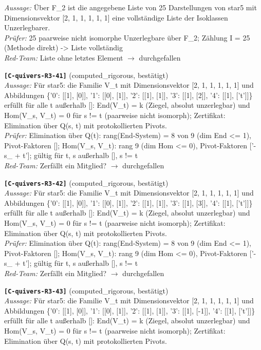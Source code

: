\documentclass[11pt]{article}
\theoremstyle{definition}\newtheorem{definition}[theorem]{Definition}\newtheorem{remark}[theorem]{Remark}\newtheorem{observation}[theorem]{Numerical observation}
\begin{document}
\textit{Aussage:} Über F\_2 ist die angegebene Liste von 25 Darstellungen von star5 mit Dimensionsvektor [2, 1, 1, 1, 1, 1] eine vollständige Liste der Isoklassen Unzerlegbarer.\\
\textit{Prüfer:} 25 paarweise nicht isomorphe Unzerlegbare über F\_2; Zählung I = 25 (Methode direkt) -> Liste vollständig\\
\textit{Red-Team:} Liste ohne letztes Element $\to$ durchgefallen\par\medskip
\noindent\textbf{\texttt{[C-quivers-R3-41]}} (computed\_rigorous, bestätigt)\\
\textit{Aussage:} Für star5: die Familie V\_t mit Dimensionsvektor [2, 1, 1, 1, 1, 1] und Abbildungen \{'0': [[1], [0]], '1': [[0], [1]], '2': [[1], [1]], '3': [[1], [2]], '4': [[1], ['t']]\} erfüllt für alle t außerhalb []: End(V\_t) = k (Ziegel, absolut unzerlegbar) und Hom(V\_s, V\_t) = 0 für s != t (paarweise nicht isomorph); Zertifikat: Elimination über Q(s, t) mit protokollierten Pivots.\\
\textit{Prüfer:} Elimination über Q(t): rang(End-System) = 8 von 9 (dim End <= 1), Pivot-Faktoren []; Hom(V\_s, V\_t): rang 9 (dim Hom <= 0), Pivot-Faktoren ['-s\_ + t']; gültig für t, s außerhalb [], s != t\\
\textit{Red-Team:} Zerfällt ein Mitglied? $\to$ durchgefallen\par\medskip
\noindent\textbf{\texttt{[C-quivers-R3-42]}} (computed\_rigorous, bestätigt)\\
\textit{Aussage:} Für star5: die Familie V\_t mit Dimensionsvektor [2, 1, 1, 1, 1, 1] und Abbildungen \{'0': [[1], [0]], '1': [[0], [1]], '2': [[1], [1]], '3': [[1], [3]], '4': [[1], ['t']]\} erfüllt für alle t außerhalb []: End(V\_t) = k (Ziegel, absolut unzerlegbar) und Hom(V\_s, V\_t) = 0 für s != t (paarweise nicht isomorph); Zertifikat: Elimination über Q(s, t) mit protokollierten Pivots.\\
\textit{Prüfer:} Elimination über Q(t): rang(End-System) = 8 von 9 (dim End <= 1), Pivot-Faktoren []; Hom(V\_s, V\_t): rang 9 (dim Hom <= 0), Pivot-Faktoren ['-s\_ + t']; gültig für t, s außerhalb [], s != t\\
\textit{Red-Team:} Zerfällt ein Mitglied? $\to$ durchgefallen\par\medskip
\noindent\textbf{\texttt{[C-quivers-R3-43]}} (computed\_rigorous, bestätigt)\\
\textit{Aussage:} Für star5: die Familie V\_t mit Dimensionsvektor [2, 1, 1, 1, 1, 1] und Abbildungen \{'0': [[1], [0]], '1': [[0], [1]], '2': [[1], [1]], '3': [[1], [-1]], '4': [[1], ['t']]\} erfüllt für alle t außerhalb []: End(V\_t) = k (Ziegel, absolut unzerlegbar) und Hom(V\_s, V\_t) = 0 für s != t (paarweise nicht isomorph); Zertifikat: Elimination über Q(s, t) mit protokollierten Pivots.\\
\end{document}
